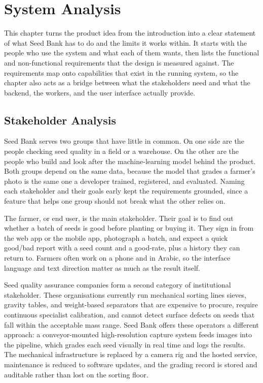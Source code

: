 \chapter{System Analysis}

This chapter turns the product idea from the introduction into a clear statement
of what Seed Bank has to do and the limits it works within. It starts with the
people who use the system and what each of them wants, then lists the functional
and non-functional requirements that the design is measured against. The
requirements map onto capabilities that exist in the running system, so the
chapter also acts as a bridge between what the stakeholders need and what the
backend, the workers, and the user interface actually provide.

\section{Stakeholder Analysis}

Seed Bank serves two groups that have little in common. On one side are the
people checking seed quality in a field or a warehouse. On the other are the
people who build and look after the machine-learning model behind the product.
Both groups depend on the same data, because the model that grades a farmer's
photo is the same one a developer trained, registered, and evaluated. Naming each
stakeholder and their goals early kept the requirements grounded, since a feature
that helps one group should not break what the other relies on.

The farmer, or end user, is the main stakeholder. Their goal is to find out
whether a batch of seeds is good before planting or buying it. They sign in from
the web app or the mobile app, photograph a batch, and expect a quick good/bad
report with a seed count and a good-rate, plus a history they can return to.
Farmers often work on a phone and in Arabic, so the interface language and text
direction matter as much as the result itself.

Seed quality assurance companies form a second category of institutional
stakeholder. These organisations currently run mechanical sorting lines sieves,
gravity tables, and weight-based separators that are expensive to procure,
require continuous specialist calibration, and cannot detect surface defects on
seeds that fall within the acceptable mass range. Seed Bank offers these
operators a different approach: a conveyor-mounted high-resolution capture system
feeds images into the pipeline, which grades each seed visually in real time and
logs the results. The mechanical infrastructure is replaced by a camera rig and
the hosted service, maintenance is reduced to software updates, and the grading
record is stored and auditable rather than lost on the sorting floor.

